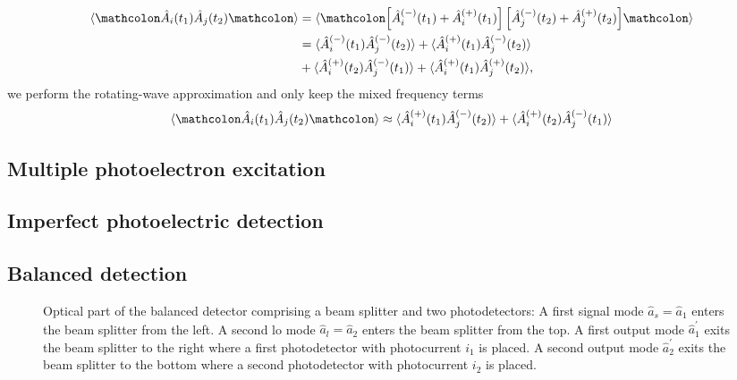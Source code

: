\begin{equation}
	\begin{split}
		\expval{
			\norder{
				\hat{A}_i(t_1)
				\hat{A}_j(t_2)
			}
		}
		&=
		\expval{
			\norder{
				\left[
					\hat{A}_i^{(-)}(t_1)
					+
					\hat{A}_i^{(+)}(t_1)
				\right]
				\left[
					\hat{A}_j^{(-)}(t_2)
					+
					\hat{A}_j^{(+)}(t_2)
				\right]
			}
		}
		\\
		&=
		\expval{
			\hat{A}_i^{(-)}(t_1)
			\hat{A}_j^{(-)}(t_2)
		}
		+
		\expval{
			\hat{A}_i^{(+)}(t_1)
			\hat{A}_j^{(-)}(t_2)
		}
		\\
		&+
		\expval{
			\hat{A}_i^{(+)}(t_2)
			\hat{A}_j^{(-)}(t_1)
		}
		+
		\expval{
			\hat{A}_i^{(+)}(t_1)
			\hat{A}_j^{(+)}(t_2)
		}
		,
	\end{split}
\end{equation}
we perform the rotating-wave approximation and only keep the mixed frequency terms
\begin{equation}
	\expval{
		\norder{
			\hat{A}_i(t_1)
			\hat{A}_j(t_2)
		}
	}
	\approx
	\expval{
		\hat{A}_i^{(+)}(t_1)
		\hat{A}_j^{(-)}(t_2)
	}
	+
	\expval{
		\hat{A}_i^{(+)}(t_2)
		\hat{A}_j^{(-)}(t_1)
	}
\end{equation}

\subsection{Multiple photoelectron excitation}


\subsection{Imperfect photoelectric detection}


\subsection{Balanced detection}


\begin{figure}[htb]
    \centering
    
    \caption{Optical part of the balanced detector comprising a beam splitter and two photodetectors: A first signal mode $\hat{a}_s=\hat{a}_1$ enters the beam splitter from the left. A second \gls{lo} mode $\hat{a}_l=\hat{a}_2$ enters the beam splitter from the top. A first output mode $\hat{a}_1^\prime$ exits the beam splitter to the right where a first photodetector with photocurrent $i_1$ is placed. A second output mode $\hat{a}_2^\prime$ exits the beam splitter to the bottom where a second photodetector with photocurrent $i_2$ is placed.}\label{fig:balanced_detector_optics}
\end{figure}

